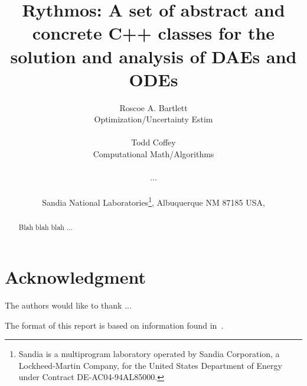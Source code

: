 \documentclass[pdf,ps2pdf,11pt]{SANDreport}
\title{
Rythmos: A set of abstract and concrete C++ classes for the solution and
analysis of DAEs and ODEs
}
\author{
Roscoe A. Bartlett \\ Optimization/Uncertainty Estim \\ \\
Todd Coffey \\ Computational Math/Algorithms \\ \\
... \\ \\
Sandia National Laboratories\footnote{
Sandia is a multiprogram laboratory operated by Sandia Corporation, a
Lockheed-Martin Company, for the United States Department of Energy
under Contract DE-AC04-94AL85000.}, Albuquerque NM 87185 USA, \\
}
\date{}
\begin{document}
\raggedright

\maketitle

%

%
\begin{abstract}
%
Blah blah blah ...
%
\end{abstract}
%

%
\clearpage
\section*{Acknowledgment}
The authors would like to thank ...

The format of this report is based on information found
in~\cite{Sand98-0730}.

%
\clearpage
\tableofcontents
\listoffigures


\end{document}
